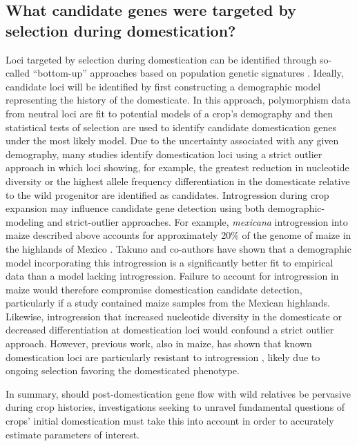 \documentclass[11pt]{article}
\begin{document}
\subsection*{What candidate genes were targeted by selection during domestication?}
Loci targeted by selection during domestication can be identified through so-called ``bottom-up'' approaches based on population genetic signatures \cite{Ross-Ibarra2007}.
Ideally, candidate loci will be identified by first constructing a demographic model representing the history of the domesticate.
In this approach, polymorphism data from neutral loci are fit to potential models of a crop's demography and then statistical tests of selection are used to identify candidate domestication genes under the most likely model.
Due to the uncertainty associated with any given demography, many studies identify domestication loci using a strict outlier approach in which loci showing, for example, the greatest reduction in nucleotide diversity or the highest allele frequency differentiation in the domesticate relative to the wild progenitor are identified as candidates.
Introgression during crop expansion may influence candidate gene detection using both demographic-modeling and strict-outlier approaches.
For example, \emph{mexicana} introgression into maize described above accounts for approximately 20\% of the genome of maize in the highlands of Mexico \cite{vanHeerwaarden2011}.
Takuno and co-authors \cite{Takuno2015} have shown that a demographic model incorporating this introgression is a significantly better fit to empirical data than a model lacking introgression.
Failure to account for introgression in maize would therefore compromise domestication candidate detection, particularly if a study contained maize samples from the Mexican highlands.
Likewise, introgression that increased nucleotide diversity in the domesticate or decreased differentiation at domestication loci would confound a strict outlier approach.
However, previous work, also in maize, has shown that known domestication loci are particularly resistant to introgression \cite{Hufford2013}, likely due to ongoing selection favoring the domesticated phenotype.
\vspace{5mm}

In summary, should post-domestication gene flow with wild relatives be pervasive during crop histories, investigations seeking to unravel fundamental questions of crops' initial domestication must take this into account in order to accurately estimate parameters of interest.
\end{document}
